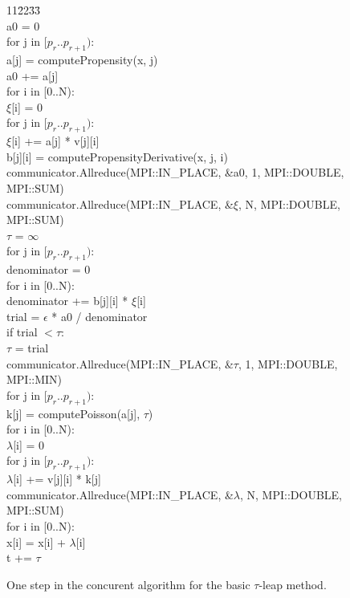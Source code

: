 \documentclass[letterpaper]{article}
\begin{document}
\begin{figure}[p]
\begin{tabbing}
11\=22\=33\=\kill\\
a0 = 0\\
for j in $[p_r..p_{r+1})$:\\
\>a[j] = computePropensity(x, j)\\
\>a0 += a[j]\\
for i in [0..N):\\
\>$\xi$[i] = 0\\
\>for j in $[p_r..p_{r+1})$:\\
\>\>$\xi$[i] += a[j] * v[j][i]\\
\>\>b[j][i] = computePropensityDerivative(x, j, i)\\
communicator.Allreduce(MPI::IN\_PLACE, \&a0, 1, MPI::DOUBLE, MPI::SUM)\\
communicator.Allreduce(MPI::IN\_PLACE, \&$\xi$, N, MPI::DOUBLE, MPI::SUM)\\
$\tau$ = $\infty$\\
for j in $[p_r..p_{r+1})$:\\
\>denominator = 0\\
\>for i in [0..N):\\
\>\>denominator += b[j][i] * $\xi$[i]\\
\>trial = $\epsilon$ * a0 / denominator\\
\>if trial $< \tau$:\\
\>\>$\tau$ = trial\\
communicator.Allreduce(MPI::IN\_PLACE, \&$\tau$, 1, MPI::DOUBLE, MPI::MIN)\\
for j in $[p_r..p_{r+1})$:\\
\>k[j] = computePoisson(a[j], $\tau$)\\
for i in [0..N):\\
\>$\lambda$[i] = 0\\
\>for j in $[p_r..p_{r+1})$:\\
\>\>$\lambda$[i] += v[j][i] * k[j]\\
communicator.Allreduce(MPI::IN\_PLACE, \&$\lambda$, N, MPI::DOUBLE, MPI::SUM)\\
for i in [0..N):\\
\>x[i] = x[i] + $\lambda$[i]\\
t += $\tau$
\end{tabbing}
\caption{One step in the concurent algorithm for the basic $\tau$-leap method.}
\label{concurrent}
\end{figure}
\end{document}
